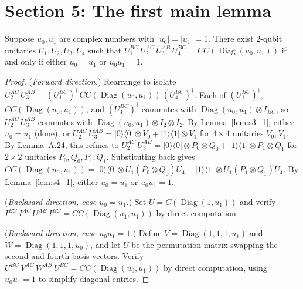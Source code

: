 \section{Section 5: The first main lemma}

\begin{lemma}
  \label{lem:s5_1}
  \leanok
  Suppose $u_0, u_1$ are complex numbers with $|u_0| = |u_1| = 1$.
  There exist $2$-qubit unitaries $U_1, U_2, U_3, U_4$ such that
  $U_1^{BC}\, U_2^{AC}\, U_3^{AB}\, U_4^{BC} = CC(\operatorname{Diag}(u_0, u_1))$
  if and only if either $u_0 = u_1$ or $u_0 u_1 = 1$.
\end{lemma}

\begin{proof}
  \leanok
  (\emph{Forward direction.})
  Rearrange to isolate
  $U_2^{AC}\, U_3^{AB}
    = (U_1^{BC})^\dagger\, CC(\operatorname{Diag}(u_0, u_1))\, (U_4^{BC})^\dagger$.
  Each of $(U_1^{BC})^\dagger$, $CC(\operatorname{Diag}(u_0, u_1))$,
  and $(U_4^{BC})^\dagger$ commutes with
  $\operatorname{Diag}(u_0, u_1) \otimes I_{BC}$,
  so $U_2^{AC}\, U_3^{AB}$ commutes with
  $\operatorname{Diag}(u_0, u_1) \otimes I_2 \otimes I_2$.
  By Lemma~\ref{lem:s3_1}, either $u_0 = u_1$ (done),
  or $U_2^{AC}\, U_3^{AB}
    = |0\rangle\langle 0| \otimes V_0 + |1\rangle\langle 1| \otimes V_1$
  for $4 \times 4$ unitaries $V_0, V_1$.
  By Lemma~A.24, this refines to
  $U_2^{AC}\, U_3^{AB}
    = |0\rangle\langle 0| \otimes P_0 \otimes Q_0
    + |1\rangle\langle 1| \otimes P_1 \otimes Q_1$
  for $2 \times 2$ unitaries $P_0, Q_0, P_1, Q_1$.
  Substituting back gives
  $CC(\operatorname{Diag}(u_0, u_1))
    = |0\rangle\langle 0| \otimes U_1 (P_0 \otimes Q_0) U_4
    + |1\rangle\langle 1| \otimes U_1 (P_1 \otimes Q_1) U_4$.
  By Lemma~\ref{lem:s4_1}, either $u_0 = u_1$ or $u_0 u_1 = 1$.

  (\emph{Backward direction, case $u_0 = u_1$.})
  Set $U = C(\operatorname{Diag}(1, u_1))$ and verify
  $I^{BC}\, I^{AC}\, U^{AB}\, I^{BC} = CC(\operatorname{Diag}(u_1, u_1))$
  by direct computation.

  (\emph{Backward direction, case $u_0 u_1 = 1$.})
  Define $V = \operatorname{Diag}(1, 1, 1, u_1)$
  and $W = \operatorname{Diag}(1, 1, 1, u_0)$,
  and let $U$ be the permutation matrix swapping the second and fourth
  basis vectors.
  Verify $U^{BC}\, V^{AC}\, W^{AB}\, U^{BC}
    = CC(\operatorname{Diag}(u_0, u_1))$
  by direct computation, using $u_0 u_1 = 1$ to simplify diagonal entries.
\end{proof}